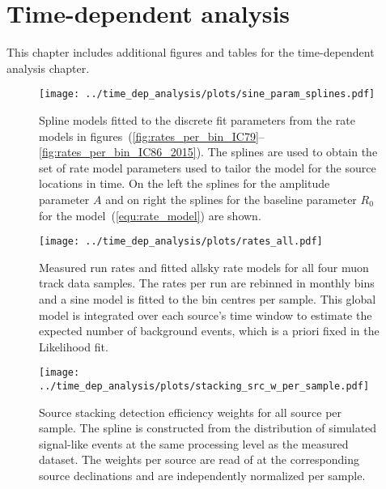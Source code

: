 \section{Time-dependent analysis}
This chapter includes additional figures and tables for the time-dependent analysis chapter.

\enlargethispage*{5cm}
\begin{figure}[H]
  \centering
  \texttt{[image: ../time\_dep\_analysis/plots/sine\_param\_splines.pdf]}
  \caption[Parameter splines for the sine rate model per sample]{
    Spline models fitted to the discrete fit parameters from the rate models in figures~(\ref{fig:rates_per_bin_IC79}--\ref{fig:rates_per_bin_IC86_2015}).
    The splines are used to obtain the set of rate model parameters used to tailor the model for the source locations in time.
    On the left the splines for the amplitude parameter $A$ and on right the splines for the baseline parameter $R_0$ for the model~(\ref{equ:rate_model}) are shown.
  }
  \label{fig:tdep_sine_param_splines}
\end{figure}

\begin{figure}[H]
  \centering
  \texttt{[image: ../time\_dep\_analysis/plots/rates\_all.pdf]}
  \caption[Total run rates and sine models for all samples]{
    Measured run rates and fitted allsky rate models for all four muon track data samples.
    The rates per run are rebinned in monthly bins and a sine model is fitted to the bin centres per sample.
    This global model is integrated over each source's time window to estimate the expected number of background events, which is a priori fixed in the Likelihood fit.
  }
  \label{fig:rates_all}
\end{figure}
\enlargethispage*{5cm}
\begin{figure}[H]
  \centering
  \texttt{[image: ../time\_dep\_analysis/plots/stacking\_src\_w\_per\_sample.pdf]}
  \caption[Source stacking weights for the time-dependent analysis]{
    Source stacking detection efficiency weights for all source per sample.
    The spline is constructed from the distribution of simulated signal-like events at the same processing level as the measured dataset.
    The weights per source are read of at the corresponding source declinations and are independently normalized per sample.
  }
  \label{fig:tdep_stacking_src_w_per_sample}
\end{figure}

